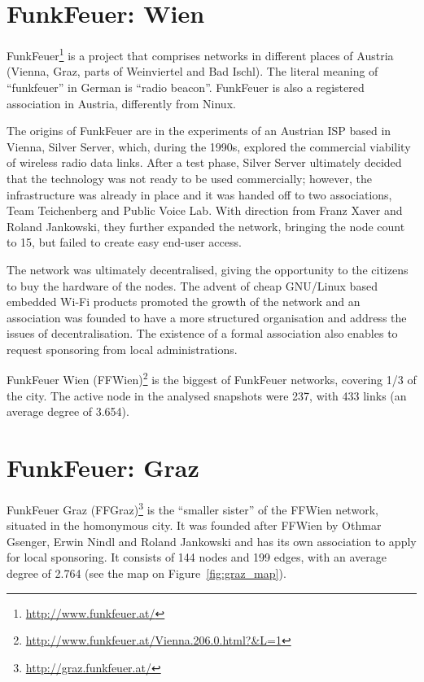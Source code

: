 \documentclass[a4paper,11pt,twoside,openright]{memoir}
\newcommand{\figref}[1] {Figure~\ref{#1}}
\begin{document}
\section{FunkFeuer: Wien}\label{funkfeuer-wien}

FunkFeuer\footnote{\url{http://www.funkfeuer.at/}} is a project that
comprises networks in different places of Austria (Vienna, Graz, parts of
Weinviertel and Bad Ischl). The literal meaning of ``funkfeuer'' in
German is ``radio beacon''. FunkFeuer is also a registered association
in Austria, differently from Ninux.

The origins of FunkFeuer are in the experiments of an Austrian ISP based
in Vienna, Silver Server, which, during the 1990s, explored the
commercial viability of wireless radio data links. After a test phase,
Silver Server ultimately decided that the technology was not ready to be
used commercially; however, the infrastructure was already in place and
it was handed off to two associations, Team Teichenberg and Public Voice
Lab. With direction from Franz Xaver and Roland Jankowski, they further
expanded the network, bringing the node count to 15, but failed to
create easy end-user access.

The network was ultimately decentralised, giving the opportunity to the
citizens to buy the hardware of the nodes. The advent of cheap GNU/Linux
based embedded Wi-Fi products promoted the growth of the network and an
association was founded to have a more structured organisation and
address the issues of decentralisation. The existence of a formal
association also enables to request sponsoring from local
administrations.

FunkFeuer Wien (FFWien)\footnote{\url{http://www.funkfeuer.at/Vienna.206.0.html?\&L=1}}
is the biggest of FunkFeuer networks, covering 1/3 of the city. The
active node in the analysed snapshots were 237, with 433 links (an
average degree of 3.654).

\section{FunkFeuer: Graz}\label{funkfeuer-graz}

FunkFeuer Graz (FFGraz)\footnote{\url{http://graz.funkfeuer.at/}} is the
``smaller sister'' of the FFWien network, situated in the homonymous
city. It was founded after FFWien by Othmar Gsenger, Erwin Nindl and
Roland Jankowski and has its own association to apply for local
sponsoring. It consists of 144 nodes and 199 edges, with an average
degree of 2.764 (see the map on \figref{fig:graz_map}).
\end{document}
